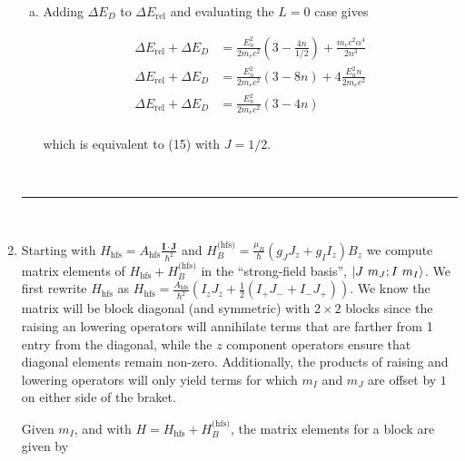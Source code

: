 \documentclass[]{article}
\begin{document}
\begin{enumerate}[1)]
\begin{enumerate}[a)]
\item Adding $\Delta E_D$ to $\Delta E_\text{rel}$ and evaluating the $L=0$ case gives

\begin{equation}
\begin{split}
\Delta E_\text{rel} + \Delta E_D  & =     \frac{E_n^2}{2m_ec^2} \left( 3 -    \frac{4n}{1/2} \right) + \frac{m_e c^2 \alpha^4}{2n^3}  \\
\Delta E_\text{rel} + \Delta E_D  & =     \frac{E_n^2}{2m_ec^2} \left( 3 -    8n \right) + 4  \frac{E_n^2 n }{2 m_e c^2}  \\
\Delta E_\text{rel} + \Delta E_D  & =     \frac{E_n^2}{2m_ec^2} \left( 3 -    4n \right) \\
\end{split}
\end{equation}

which is equivalent to (15) with $J=1/2$. 



\end{enumerate}


\hfill \\
\noindent\rule{15cm}{0.4pt} \\


\item Starting with $H_\text{hfs} = A_\text{hfs} \frac{\bm{I}\cdot\bm{J}}{\hbar^2}$ and $H_B^\text{(hfs)} = \frac{\mu_B}{\hbar} (g_J J_z + g_I I_z) B_z$ we compute matrix elements of $ H_\text{hfs} + H_B^\text{(hfs)}$ in the ``strong-field basis'', $\ket{J\text{ }m_J ; I\text{ }m_I}$. We first rewrite $H_\text{hfs}$ as $H_\text{hfs} = \frac{A_\text{hfs}}{\hbar^2} ( I_z J_z + \frac{1}{2}\left( I_+J_- + I_-J_+ \right))$. We know the matrix will be block diagonal (and symmetric) with $2 \times 2$ blocks since the raising an lowering operators will annihilate terms that are farther from 1 entry from the diagonal, while the $z$ component operators ensure that diagonal elements remain non-zero. Additionally, the products of raising and lowering operators will only yield terms for which $m_I$ and $m_J$ are offset by $1$ on either side of the braket. 

Given $m_I$, and with $H =   H_\text{hfs} + H_B^\text{(hfs)}$, the matrix elements for a block are given by


\end{enumerate}
\end{document}
